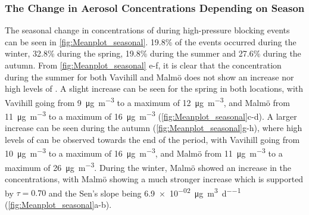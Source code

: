 \newpage 


\subsubsection{The Change in Aerosol Concentrations Depending on Season}
The seasonal change in concentrations of \PM during high-pressure blocking events can be seen in \autoref{fig:Meanplot_seasonal}. 19.8\% of the events occurred during the winter, 32.8\% during the spring, 19.8\% during the summer and 27.6\% during the autumn. From \autoref{fig:Meanplot_seasonal} e-f, it is clear that the concentration during the summer for both Vavihill and Malmö does not show an increase nor high levels of \PM. A slight increase can be seen for the spring in both locations, with Vavihill going from \SI{9}{\micro\gram\per\meter\cubed} to a maximum of \SI{12}{\micro\gram\per\meter\cubed}, and Malmö from \SI{11}{\micro\gram\per\meter\cubed} to a maximum of \SI{16}{\micro\gram\per\meter\cubed} (\autoref{fig:Meanplot_seasonal}c-d). A larger increase can be seen during the autumn (\autoref{fig:Meanplot_seasonal}g-h), where high levels of \PM can be observed towards the end of the period, with Vavihill going from \SI{10}{\micro\gram\per\meter\cubed} to a maximum of \SI{16}{\micro\gram\per\meter\cubed}, and Malmö from \SI{11}{\micro\gram\per\meter\cubed} to a maximum of \SI{26}{\micro\gram\per\meter\cubed}. During the winter, Malmö showed an increase in the \PM concentrations, with Malmö showing a much stronger increase which is supported by $\tau=0.70$ and the Sen's slope being \SI{6.9e-02}{\micro\gram\per\meter\cubed\per\day} (\autoref{fig:Meanplot_seasonal}a-b). 

